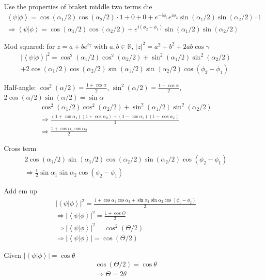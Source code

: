 \documentclass[
]{article}
\providecommand{\braket}[1]{\left\langle #1 \right\rangle}
\providecommand{\Rarr}{\Rightarrow}
\providecommand{\R}{\mathbb{R}}
\begin{document}
Use the properties of braket middle two terms die
\begin{gather*}
	\braket{\psi|\phi}=\cos(\alpha_1/2)\cos(\alpha_2/2)\cdot 1+0+0+e^{-i\phi_1}e^{i\phi_2}\sin(\alpha_1/2)\sin(\alpha_2/2)\cdot 1\\
	\Rarr \braket{\psi|\phi}=\cos(\alpha_1/2)\cos(\alpha_2/2)+e^{i(\phi_2-\phi_1)}\sin(\alpha_1/2)\sin(\alpha_2/2)
\end{gather*}

Mod squared: for \(z=a+be^{i\gamma}\) with \(a,b\in\R\), \(|z|^2=a^2+b^2+2ab\cos\gamma\)
\begin{gather*}
	|\braket{\psi|\phi}|^2=\cos^2(\alpha_1/2)\cos^2(\alpha_2/2)+\sin^2(\alpha_1/2)\sin^2(\alpha_2/2)\\
	+2\cos(\alpha_1/2)\cos(\alpha_2/2)\sin(\alpha_1/2)\sin(\alpha_2/2)\cos(\phi_2-\phi_1)
\end{gather*}

Half-angle: \(\cos^2(\alpha/2)=\tfrac{1+\cos\alpha}{2}\), \(\sin^2(\alpha/2)=\tfrac{1-\cos\alpha}{2}\), \(2\cos(\alpha/2)\sin(\alpha/2)=\sin\alpha\)
\begin{gather*}
	\cos^2(\alpha_1/2)\cos^2(\alpha_2/2)+\sin^2(\alpha_1/2)\sin^2(\alpha_2/2)\\
	\Rarr \tfrac{(1+\cos\alpha_1)(1+\cos\alpha_2)+(1-\cos\alpha_1)(1-\cos\alpha_2)}{4}\\
	\Rarr \tfrac{1+\cos\alpha_1\cos\alpha_2}{2}
\end{gather*}

Cross term
\begin{gather*}
	2\cos(\alpha_1/2)\sin(\alpha_1/2)\cos(\alpha_2/2)\sin(\alpha_2/2)\cos(\phi_2-\phi_1)\\
	\Rarr \tfrac{1}{2}\sin\alpha_1\sin\alpha_2\cos(\phi_2-\phi_1)
\end{gather*}

Add em up
\begin{gather*}
	|\braket{\psi|\phi}|^2=\tfrac{1+\cos\alpha_1\cos\alpha_2+\sin\alpha_1\sin\alpha_2\cos(\phi_1-\phi_2)}{2}\\
	\Rarr |\braket{\psi|\phi}|^2=\tfrac{1+\cos\Theta}{2}\\
	\Rarr |\braket{\psi|\phi}|^2=\cos^2(\Theta/2)\\
	\Rarr |\braket{\psi|\phi}|=\cos(\Theta/2)
\end{gather*}

Given \(|\braket{\psi|\phi}|=\cos\theta\)
\begin{gather*}
	\cos(\Theta/2)=\cos\theta\\
	\Rarr \Theta=2\theta
\end{gather*}
\end{document}
